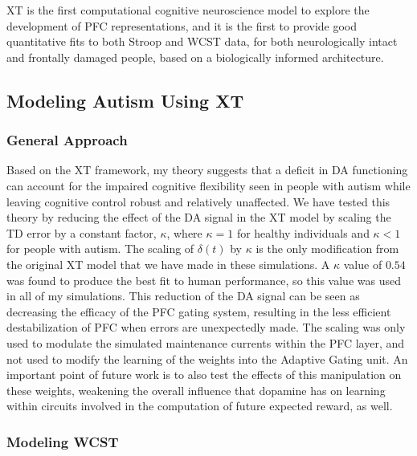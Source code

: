 XT is the first computational cognitive neuroscience model to explore
the development of PFC representations, and it is the first to provide
good quantitative fits to both Stroop and WCST data, for both
neurologically intact and frontally damaged people, based on a biologically informed architecture.

\subsection{Modeling Autism Using XT}

\subsubsection{General Approach}
Based on the XT framework, my theory suggests that a deficit in DA functioning can account for the impaired cognitive flexibility seen in people with autism while leaving cognitive control robust and relatively unaffected.  We have tested this theory by reducing the effect of the DA signal in the XT model by scaling the TD error by a constant factor, $\kappa$, where $\kappa = 1$ for healthy individuals and $\kappa < 1$ for people with autism.  The scaling of $\delta(t)$ by $\kappa$ is the only modification from the original XT model that we have made in these simulations.  A $\kappa$ value of $0.54$ was found to produce the best fit to human performance, so this value was used in all of my simulations.  This reduction of the DA signal can be seen as decreasing the efficacy of the PFC gating system, resulting in the less efficient destabilization of PFC when errors are unexpectedly made.  The scaling was only used to modulate the simulated maintenance currents within the PFC layer, and not used to modify the learning of the weights into the Adaptive Gating unit.  An important point of future work is to also test the effects of this manipulation on these weights, weakening the overall influence that dopamine has on learning within circuits involved in the computation of future expected reward, as well.  


\subsubsection{Modeling WCST} 

